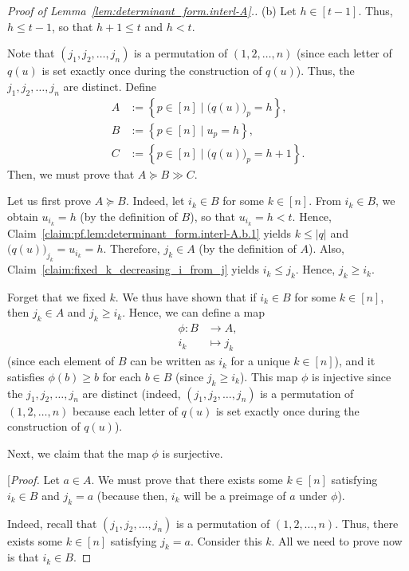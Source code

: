 \documentclass[reqno]{amsart}
\newcommand{\0}{\phantom{c}}
\newenvironment{verlong}{}{}
\newcommand{\set}[1]{\left\{ #1 \right\}}
\newcommand{\abs}[1]{\left| #1 \right|}
\newcommand{\tup}[1]{\left( #1 \right)}
\newcommand{\ive}[1]{\left[ #1 \right]}
\theoremstyle{plain}
\theoremstyle{definition}
\numberwithin{equation}{section}
\begin{document}
\begin{proof}[Proof of Lemma~\ref{lem:determinant_form.interl-A}.]
(b) Let $h \in \ive{t-1}$.
\begin{verlong}
Thus, $h \leq t-1$, so that $h + 1 \leq t$ and $h < t$.

Note that $\tup{ j_1, j_2, \dotsc, j_n}$ is a permutation of $\tup{1, 2, \dotsc, n}$ (since each letter of $q(u)$ is set exactly once during the construction of $q(u)$).
Thus, the $j_1, j_2, \dotsc, j_n$ are distinct.
\end{verlong}
Define
\begin{align*}
A & := \set{ p\in \ive{n} \mid \bigl( q(u) \bigr)_p = h },
\\ B & := \set{ p\in \ive{n} \mid u_p = h },
\\ C & := \set{ p\in \ive{n} \mid \bigl( q(u) \bigr)_p = h+1 }.
\end{align*}
Then, we must prove that $A \succeq B \gg C$.

Let us first prove $A \succeq B$.
Indeed, let $i_k\in B$ for some $k \in \ive{n}$.
From $i_k\in B$, we obtain $u_{i_k} = h$ (by the definition of $B$), so that $u_{i_k} = h < t$.
Hence, Claim~\ref{claim:pf.lem:determinant_form.interl-A.b.1} yields $k\leq \abs{q}$ and $\bigl( q(u) \bigr)_{j_k} = u_{i_k} = h$.
Therefore, $j_k\in A$ (by the definition of $A$).
Also, Claim~\ref{claim:fixed_k_decreasing_i_from_j} yields $i_k\leq j_k$.
Hence, $j_k\geq i_k$.

Forget that we fixed $k$. We thus have shown that if $i_k\in B$ for some $k \in \ive{n} $, then $j_k\in A$ and $j_k\geq i_k$.
Hence, we can define a map
\begin{align*}
\phi \colon B & \to A, \\
i_k & \mapsto j_k
\end{align*}
(since each element of $B$ can be written as $i_k$ for a unique $k\in \ive{n} $), and it satisfies $\phi(b) \geq b$ for each $b \in B$ (since $j_k \geq i_k$).
This map $\phi$ is injective since the $j_1, j_2, \dotsc, j_n$ are distinct (indeed, $\tup{j_1, j_2, \dotsc, j_n}$ is a permutation of $\tup{1, 2, \dotsc, n}$ because each letter of $q(u)$ is set exactly once during the construction of $q(u)$).

Next, we claim that the map $\phi$ is surjective.

[\textit{Proof.} Let $a\in A$.
We must prove that there exists some $k\in \ive{n}$ satisfying $i_k \in B$ and $j_k = a$ (because then, $i_k$ will be a preimage of $a$ under $\phi$).

Indeed, recall that $\left( j_1,j_2,\ldots ,j_n\right) $ is a permutation of $\tup{1, 2, \dotsc, n}$.
Thus, there exists some $k \in \ive{n}$ satisfying $j_k = a$.
Consider this $k$.
All we need to prove now is that $i_k \in B$.


\end{proof}
\end{document}
